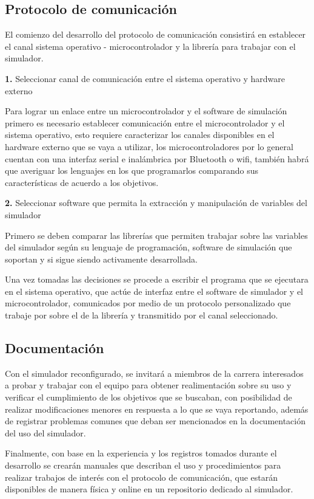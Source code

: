 \subsection{Protocolo de comunicación}

El comienzo del desarrollo del protocolo de comunicación consistirá en establecer el canal sistema operativo - microcontrolador y la librería para trabajar con el simulador.

\noindent
\textbf{1.} Seleccionar canal de comunicación entre el sistema operativo y hardware externo

Para lograr un enlace entre un microcontrolador y el software de simulación primero es necesario establecer comunicación entre el microcontrolador y el sistema operativo, esto requiere caracterizar los canales disponibles en el hardware externo que se vaya a utilizar, los microcontroladores por lo general cuentan con una interfaz serial e inalámbrica por Bluetooth o wifi, también habrá que averiguar los lenguajes en los que programarlos comparando sus características de acuerdo a los objetivos.

\noindent
\textbf{2.} Seleccionar software que permita la extracción y manipulación de variables del simulador

Primero se deben comparar las librerías que permiten trabajar sobre las variables del simulador según su lenguaje de programación, software de simulación que soportan y si sigue siendo activamente desarrollada.

Una vez tomadas las decisiones se procede a escribir el programa que se ejecutara en el sistema operativo, que actúe de interfaz entre el software de simulador y el microcontrolador, comunicados por medio de un protocolo personalizado que trabaje por sobre el de la librería y transmitido por el canal seleccionado.

\subsection{Documentación}

Con el simulador reconfigurado, se invitará a miembros de la carrera interesados a probar y trabajar con el equipo para obtener realimentación sobre su uso y verificar el cumplimiento de los objetivos que se buscaban, con posibilidad de realizar modificaciones menores en respuesta a lo que se vaya reportando, además de registrar problemas comunes que deban ser mencionados en la documentación del uso del simulador.

Finalmente, con base en la experiencia y los registros tomados durante el desarrollo se crearán manuales que describan el uso y procedimientos para realizar trabajos de interés con el protocolo de comunicación, que estarán disponibles de manera física y online en un repositorio dedicado al simulador.
